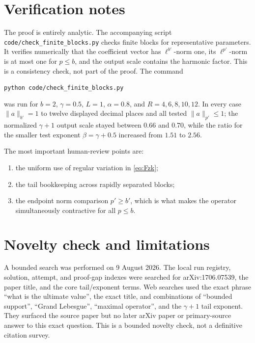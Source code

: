 \documentclass[11pt]{article}
\begin{document}
\section{Verification notes}

The proof is entirely analytic.  The accompanying script
\texttt{code/check\_finite\_blocks.py} checks finite blocks for representative
parameters.  It verifies numerically that the coefficient vector has
\(\ell^{b'}\)-norm one, its \(\ell^{p'}\)-norm is at most one for \(p\le b\),
and the output scale contains the harmonic factor.  This is a consistency
check, not part of the proof.  The command
\begin{center}
\texttt{python code/check\_finite\_blocks.py}
\end{center}
was run for \(b=2\), \(\gamma=0.5\), \(L=1\), \(\alpha=0.8\), and
\(R=4,6,8,10,12\).  In every case \(\|a\|_{b'}=1\) to twelve displayed
decimal places and all tested \(\|a\|_{p'}\le1\); the normalized
\(\gamma+1\) output scale stayed between \(0.66\) and \(0.70\), while the
ratio for the smaller test exponent \(\beta=\gamma+0.5\) increased from
\(1.51\) to \(2.56\).

The most important human-review points are:
\begin{enumerate}
\item the uniform use of regular variation in \eqref{eq:Fzk};
\item the tail bookkeeping across rapidly separated blocks;
\item the endpoint norm comparison \(p'\ge b'\), which is what makes the
operator simultaneously contractive for all \(p\le b\).
\end{enumerate}

\section{Novelty check and limitations}

A bounded search was performed on 9 August 2026.  The local run registry,
solution, attempt, and proof-gap indexes were searched for arXiv:1706.07539,
the paper title, and the core tail/exponent terms.  Web searches used the
exact phrase ``what is the ultimate value'', the exact title, and combinations
of ``bounded support'', ``Grand Lebesgue'', ``maximal operator'', and the
\(\gamma+1\) tail exponent.  They surfaced the source paper but no later arXiv
paper or primary-source answer to this exact question.  This is a bounded
novelty check, not a definitive citation survey.
\end{document}
